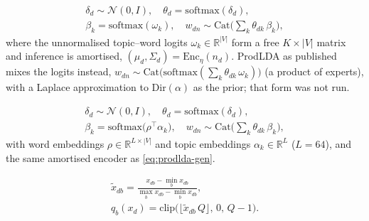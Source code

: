 \begin{equation}\label{eq:prodlda-gen}
\begin{gathered}
\delta_d \sim \mathcal{N}(0, I),\quad
\theta_d = \mathrm{softmax}(\delta_d),\\
\beta_k = \mathrm{softmax}(\omega_k),\quad
w_{dn} \sim \mathrm{Cat}\!\Big(\textstyle\sum_k \theta_{dk}\,\beta_k\Big),
\end{gathered}
\end{equation}
where the unnormalised topic--word logits $\omega_k\in\mathbb{R}^{|V|}$ form
a free $K\times|V|$ matrix and inference is amortised,
$(\mu_d,\Sigma_d)=\mathrm{Enc}_\eta(n_d)$. ProdLDA as published mixes the
logits instead, $w_{dn}\sim\mathrm{Cat}\big(\mathrm{softmax}(\textstyle\sum_k \theta_{dk}\,\omega_k)\big)$
(a product of experts), with a Laplace approximation to $\mathrm{Dir}(\alpha)$
as the prior; that form was not run.

\begin{equation}\label{eq:etm-beta}
\begin{gathered}
\delta_d \sim \mathcal{N}(0, I),\quad
\theta_d = \mathrm{softmax}(\delta_d),\\
\beta_k = \mathrm{softmax}\!\big(\rho^{\top}\alpha_k\big),\quad
w_{dn}\sim\mathrm{Cat}\!\Big(\textstyle\sum_k \theta_{dk}\,\beta_k\Big),
\end{gathered}
\end{equation}
with word embeddings $\rho\in\mathbb{R}^{L\times|V|}$ and topic
embeddings $\alpha_k\in\mathbb{R}^{L}$ ($L=64$), and the same amortised
encoder as \eqref{eq:prodlda-gen}.


\begin{equation}\label{eq:quantiser}
\begin{gathered}
\tilde{x}_{db}=\frac{x_{db}-\min_b x_{db}}{\max_b x_{db}-\min_b x_{db}},
\\
q_b(x_d)=\mathrm{clip}\big(\lfloor \tilde{x}_{db}\,Q\rfloor,\,0,\,Q-1\big).
\end{gathered}
\end{equation}

